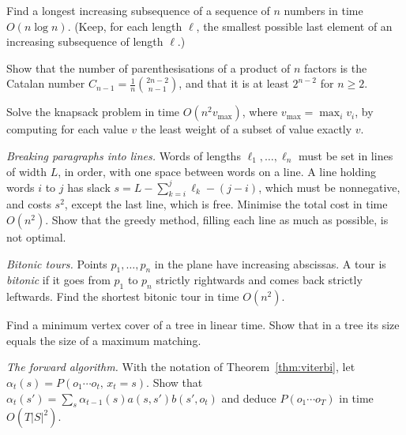 \begin{exercise}[$\star\star$]\label{ex:lis}
Find a longest increasing subsequence of a sequence of $n$ numbers in time $O(n\log n)$. (Keep, for each length $\ell$, the smallest possible last element of an increasing subsequence of length $\ell$.)
\end{exercise}

\begin{exercise}[$\star$]\label{ex:catalan}
Show that the number of parenthesisations of a product of $n$ factors is the Catalan number $C_{n-1}=\frac1n\binom{2n-2}{n-1}$, and that it is at least $2^{n-2}$ for $n\ge2$.
\end{exercise}

\begin{exercise}[$\star$]\label{ex:knapsackvalue}
Solve the knapsack problem in time $O(n^2v_{\max})$, where $v_{\max}=\max_iv_i$, by computing for each value $v$ the least weight of a subset of value exactly $v$.
\end{exercise}

\begin{exercise}[$\star\star$]\label{ex:linebreak}
\emph{Breaking paragraphs into lines.} Words of lengths $\ell_1,\dots,\ell_n$ must be set in lines of width $L$, in order, with one space between words on a line. A line holding words $i$ to $j$ has slack $s=L-\sum_{k=i}^j\ell_k-(j-i)$, which must
be nonnegative, and costs $s^2$, except the last line, which is free. Minimise the total cost in time $O(n^2)$. Show that the greedy method, filling each line as much as possible, is not optimal.
\end{exercise}

\begin{exercise}[$\star\star$]\label{ex:bitonic}
\emph{Bitonic tours.} Points $p_1,\dots,p_n$ in the plane have increasing abscissas. A tour is \emph{bitonic} if it goes from $p_1$ to $p_n$ strictly rightwards and comes back strictly leftwards. Find the shortest bitonic tour in time $O(n^2)$.
\end{exercise}

\begin{exercise}[$\star$]\label{ex:treevc}
Find a minimum vertex cover of a tree in linear time. Show that in a tree its size equals the size of a maximum matching.
\end{exercise}

\begin{exercise}[$\star$]\label{ex:forward}
\emph{The forward algorithm.} With the notation of Theorem~\ref{thm:viterbi}, let $\alpha_t(s)=P(o_1\cdots o_t,\,x_t=s)$. Show that $\alpha_t(s')=\sum_s\alpha_{t-1}(s)a(s,s')b(s',o_t)$ and deduce $P(o_1\cdots o_T)$ in time $O(T|S|^2)$.
\end{exercise}

